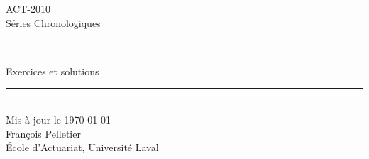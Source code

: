 \begin{center}
\thispagestyle{empty}
{\LARGE ACT-2010 \\
\vspace*{\baselineskip}
Séries Chronologiques}
\rule{\textwidth}{0.8pt}\\[\baselineskip]
\vspace*{16\baselineskip}
{\LARGE Exercices et solutions} \\
\vfill
\rule{\textwidth}{0.8pt}\\[\baselineskip]
{\large Mis à jour le \today \\
François Pelletier \\
École d'Actuariat, Université Laval}
\end{center}
\clearpage
\setcounter{page}{1}
